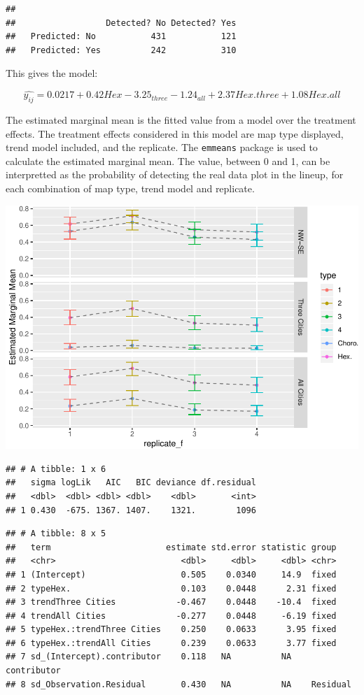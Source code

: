 \documentclass[conference,final,]{IEEEtran}
\makeatletter
\def\maxwidth{\ifdim\Gin@nat@width>\linewidth\linewidth
\else\Gin@nat@width\fi}
\let\Oldincludegraphics\includegraphics
\renewcommand{\includegraphics}[1]{\Oldincludegraphics[width=\maxwidth]{#1}}
\makeatother
\begin{document}
\begin{verbatim}
##                 
##                  Detected? No Detected? Yes
##   Predicted: No           431           121
##   Predicted: Yes          242           310
\end{verbatim}

This gives the model:

\[\widehat{y_{ij}} = 0.0217 + 0.42Hex -3.25_{three} -1.24_{all} + 2.37{Hex.three} + 1.08{Hex.all} \]

The estimated marginal mean is the fitted value from a model over the
treatment effects. The treatment effects considered in this model are
map type displayed, trend model included, and the replicate. The
\texttt{emmeans} package is used to calculate the estimated marginal
mean. The value, between 0 and 1, can be interpretted as the probability
of detecting the real data plot in the lineup, for each combination of
map type, trend model and replicate.

\includegraphics{paper_files/figure-latex/unnamed-chunk-3-1.pdf}

\begin{verbatim}
## # A tibble: 1 x 6
##   sigma logLik   AIC   BIC deviance df.residual
##   <dbl>  <dbl> <dbl> <dbl>    <dbl>       <int>
## 1 0.430  -675. 1367. 1407.    1321.        1096
\end{verbatim}

\begin{verbatim}
## # A tibble: 8 x 5
##   term                       estimate std.error statistic group      
##   <chr>                         <dbl>     <dbl>     <dbl> <chr>      
## 1 (Intercept)                   0.505    0.0340     14.9  fixed      
## 2 typeHex.                      0.103    0.0448      2.31 fixed      
## 3 trendThree Cities            -0.467    0.0448    -10.4  fixed      
## 4 trendAll Cities              -0.277    0.0448     -6.19 fixed      
## 5 typeHex.:trendThree Cities    0.250    0.0633      3.95 fixed      
## 6 typeHex.:trendAll Cities      0.239    0.0633      3.77 fixed      
## 7 sd_(Intercept).contributor    0.118   NA          NA    contributor
## 8 sd_Observation.Residual       0.430   NA          NA    Residual
\end{verbatim}
\end{document}
